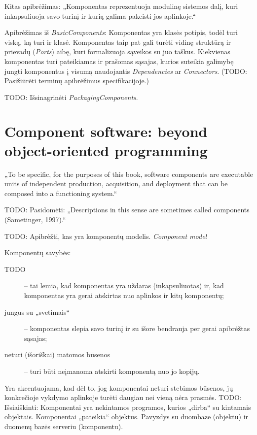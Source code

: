 Kitas apibrėžimas: „Komponentas reprezentuoja modulinę sistemos dalį, kuri
inkapsuliuoja savo turinį ir kurią galima pakeisti jos aplinkoje.“
\cite[146]{UML-superstructure}

Apibrėžimas iš \emph{BasicComponents}\cite[146]{UML-superstructure}:
Komponentas yra klasės potipis, todėl turi viską, ką turi ir klasė. 
Komponentas taip pat gali turėti vidinę struktūrą ir prievadų (\emph{Ports})
aibę, kuri formalizuoja sąveikos su juo taškus. Kiekvienas komponentas turi
pateikiamas ir prašomas sąsajas, kurios suteikia galimybę jungti
komponentus į visumą naudojantis \emph{Dependencies} ar \emph{Connectors}.
(TODO: Pasižiūrėti terminų apibrėžimus specifikacijoje.)

TODO: Išsinagrinėti \emph{PackagingComponents}.

\section{Component software: beyond object-oriented programming}

„To be specific, for the purposes of this book, software components
are executable units of independent production, acquisition, and deployment
that can be composed into a functioning system.“ 
\cite[3]{cs-beyond-object-oriented-programming}

TODO: Pasidomėti: „Descriptions in this sense are sometimes called
components (Sametinger, 1997).“%
\cite[3]{cs-beyond-object-oriented-programming}

TODO: Apibrėžti, kas yra komponentų modelis. \emph{Component model}

Komponentų savybės\cite[36]{cs-beyond-object-oriented-programming}:
\begin{description}
  \item[TODO] 
    – tai lemia, kad komponentas yra uždaras (inkapsuliuotas) ir, kad
    komponentas yra gerai atskirtas nuo aplinkos ir kitų komponentų;
  \item[jungus su „svetimais“] 
    – komponentas slepia savo turinį ir su išore bendrauja per gerai
    apibrėžtas sąsajas;
  \item[neturi (išoriškai) matomos būsenos]  – turi būti neįmanoma atskirti komponentą
    nuo jo kopijų.
\end{description}
Yra akcentuojama, kad dėl to, jog komponentai neturi stebimos būsenos,
jų konkrečioje vykdymo aplinkoje turėti daugiau nei vieną nėra prasmės.
TODO: Išsiaiškinti\cite[37]{cs-beyond-object-oriented-programming}:
Komponentai yra nekintamos programos, kurios „dirba“ su kintamais
objektais. Komponentai „pateikia“ objektus. 
Pavyzdys su duombaze (objektu) ir duomenų bazės serveriu (komponentu).

